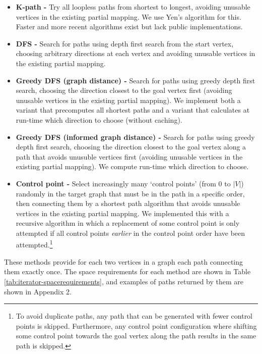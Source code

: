 \begin{itemize}
\item \textbf{K-path -} Try all loopless paths from shortest to longest, avoiding unusable vertices in the existing partial mapping. We use Yen's algorithm \cite{YensAlgorithm} for this. Faster and more recent algorithms exist \cite{Hershberger, Brander1996} but lack public implementations.

\item \textbf{DFS -} Search for paths using depth first search from the start vertex, choosing arbitrary directions at each vertex and avoiding unusable vertices in the existing partial mapping.

\item \textbf{Greedy DFS (graph distance) -} Search for paths using greedy depth first search, choosing the direction closest to the goal vertex first (avoiding unusable vertices in the existing partial mapping). We implement both a variant that precomputes all shortest paths and a variant that calculates at run-time which direction to choose (without caching).

\item \textbf{Greedy DFS (informed graph distance) -} Search for paths using greedy depth first search, choosing the direction closest to the goal vertex along a path that avoids unusuble vertices first (avoiding unusable vertices in the existing partial mapping). We compute run-time which direction to choose.

\item \textbf{Control point -} Select increasingly many `control points' (from $0$ to $|V|$) randomly in the target graph that must be in the path in a specific order, then connecting them by a shortest path algorithm that avoids unusable vertices in the existing partial mapping. We implemented this with a recursive algorithm in which a replacement of some control point is only attempted if all control points \textit{earlier} in the control point order have been attempted.\footnote{To avoid duplicate paths, any path that can be generated with fewer control points is skipped. Furthermore, any control point configuration where shifting some control point towards the goal vertex along the path results in the same path is skipped.}
\end{itemize}

These methods provide for each two vertices in a graph each path connecting them exactly once. The space requirements for each method are shown in Table \ref{tab:iterator-spacerequirements}, and examples of paths returned by them are shown in Appendix 2.

